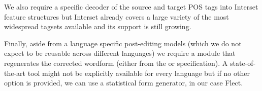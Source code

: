 We also require a specific decoder of the source and target POS tags into Interset feature
structures but Interset already covers a large variety of the most widespread tagsets available
and its support is still growing.

Finally, aside from a language specific post-editing models (which we do not expect
to be reusable across different languages) we require a module that regenerates
the corrected wordform (either from the  or  specification).
A state-of-the-art tool might not be explicitly available for every language but if no
other option is provided, we can use a statistical form generator, in our case Flect.
